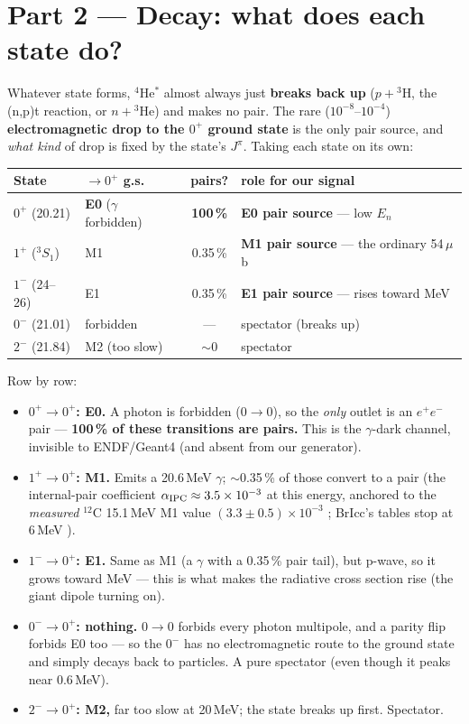 \documentclass[11pt,a4paper]{article}
\newcommand{\He}[1]{$^{#1}$He}
\begin{document}
\section*{Part 2 --- Decay: what does each state do?}

Whatever state forms, \He{4}$^*$ almost always just \textbf{breaks back up}
($p+{}^3$H, the (n,p)t reaction, or $n+{}$\He{3}) and makes no pair. The rare
($10^{-8}$--$10^{-4}$) \textbf{electromagnetic drop to the $0^+$ ground state} is
the only pair source, and \emph{what kind} of drop is fixed by the state's
$J^\pi$. Taking each state on its own:

\begin{center}
\renewcommand{\arraystretch}{1.25}
\begin{tabular}{llcl}
\hline
State & $\to0^+$ g.s. & pairs? & role for our signal \\
\hline
\textbf{$0^+$} (20.21) & \textbf{E0} ($\gamma$ forbidden) & \textbf{100\,\%} & \textbf{E0 pair source} --- low $E_n$ \\
\textbf{$1^+$} ($^3S_1$) & M1 & 0.35\,\% & \textbf{M1 pair source} --- the ordinary 54\,$\mu$b \\
\textbf{$1^-$} (24--26) & E1 & 0.35\,\% & \textbf{E1 pair source} --- rises toward MeV \\
$0^-$ (21.01) & forbidden & --- & spectator (breaks up) \\
$2^-$ (21.84) & M2 (too slow) & $\sim$0 & spectator \\
\hline
\end{tabular}
\end{center}

\noindent Row by row:
\begin{itemize}\setlength\itemsep{1pt}
  \item \textbf{$0^+\to0^+$: E0.} A photon is forbidden ($0\to0$), so the
    \emph{only} outlet is an $e^+e^-$ pair --- \textbf{100\,\% of these
    transitions are pairs.} This is the $\gamma$-dark channel, invisible to
    ENDF/Geant4 (and absent from our generator).
  \item \textbf{$1^+\to0^+$: M1.} Emits a 20.6\,MeV $\gamma$; $\sim$0.35\,\% of
    those convert to a pair (the internal-pair coefficient
    $\alpha_{\rm IPC}\approx3.5\times10^{-3}$ at this energy, anchored to the
    \emph{measured} $^{12}$C 15.1\,MeV M1 value $(3.3\pm0.5)\times10^{-3}$
    \cite{ipc12c}; BrIcc's tables stop at 6\,MeV \cite{bricc}).
  \item \textbf{$1^-\to0^+$: E1.} Same as M1 (a $\gamma$ with a 0.35\,\% pair
    tail), but p-wave, so it grows toward MeV --- this is what makes the
    radiative cross section rise (the giant dipole turning on).
  \item \textbf{$0^-\to0^+$: nothing.} $0\to0$ forbids every photon multipole,
    and a parity flip forbids E0 too --- so the $0^-$ has no electromagnetic
    route to the ground state and simply decays back to particles. A pure
    spectator (even though it peaks near 0.6\,MeV).
  \item \textbf{$2^-\to0^+$: M2,} far too slow at 20\,MeV; the state breaks up
    first. Spectator.
\end{itemize}
\end{document}
